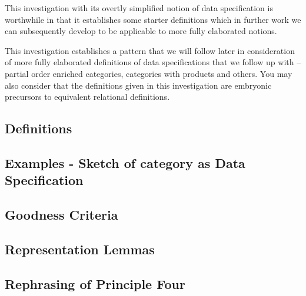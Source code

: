 \documentclass[10pt,a4paper]{article}
\theoremstyle{remark}
\begin{document}
\note
This investigation with its overtly simplified notion of data specification is worthwhile in that   it establishes some starter definitions which in further work we can subsequently develop to be applicable to more fully elaborated notions.

\note 
This investigation establishes a pattern that we will follow later in consideration of more fully elaborated 
definitions of 
data specifications that we follow up with -- partial order enriched categories, categories with products and others. 
You may also consider that the definitions given in this investigation are embryonic precursors to equivalent relational definitions.



\subsection{Definitions}

\fi %

\subsection{Examples - Sketch of category as Data Specification}

\subsection{Goodness Criteria}

\subsection{Representation Lemmas}

\subsection{Rephrasing of Principle Four}


\iffalse
\section{Case Study}

\fi

 

\end{document}
